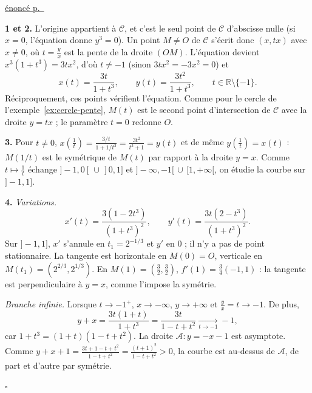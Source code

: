 \documentclass[a4paper,11pt]{article}
\numberwithin{equation}{section}
\numberwithin{figure}{section}
\numberwithin{table}{section}
\theoremstyle{enonce}
\theoremstyle{exemple}
\theoremstyle{remarque}
\newenvironment{corrige}[1]{%
  \par\needspace{6\baselineskip}\vspace{1em}\phantomsection\label{c:#1}%
  \noindent{\sffamily\bfseries\color{Bleu}Exercice~\ref{e:#1}}\quad
  {\scriptsize\sffamily\hyperref[e:#1]{\color{Gris}énoncé p.~\pageref{e:#1}}}\par\nobreak\vspace{0.2em}}%
  {\hfill\textcolor{BleuClair}{$\square$}\par}
\newcommand{\R}{\mathbb{R}}
\begin{document}
\begin{corrige}{b-folium}
\textbf{1 et 2.} L'origine appartient à $\mathcal C$, et c'est le seul point de $\mathcal C$ d'abscisse nulle (si $x=0$,
l'équation donne $y^3=0$). Un point $M\neq O$ de $\mathcal C$ s'écrit donc $(x,tx)$ avec $x\neq0$, où $t=\frac yx$ est la
pente de la droite $(OM)$. L'équation devient $x^3(1+t^3)=3tx^2$, d'où $t\neq-1$ (sinon $3tx^2=-3x^2=0$) et
\[x(t)=\frac{3t}{1+t^3},\qquad y(t)=\frac{3t^2}{1+t^3},\qquad t\in\R\setminus\{-1\}.\]
Réciproquement, ces points vérifient l'équation. Comme pour le cercle de l'exemple~\ref{ex:cercle-pente}, $M(t)$ est le
second point d'intersection de $\mathcal C$ avec la droite $y=tx$ ; le paramètre $t=0$ redonne $O$.

\textbf{3.} Pour $t\neq0$, $x\left(\frac1t\right)=\frac{3/t}{1+1/t^3}=\frac{3t^2}{t^3+1}=y(t)$ et de même
$y\left(\frac1t\right)=x(t)$ : $M(1/t)$ est le symétrique de $M(t)$ par rapport à la droite $y=x$. Comme $t\mapsto\frac1t$
échange $]-1,0[\,\cup\,]0,1]$ et $]-\infty,-1[\,\cup\,[1,+\infty[$, on étudie la courbe sur $]-1,1]$.

\textbf{4.} \emph{Variations.}
\[x'(t)=\frac{3(1-2t^3)}{(1+t^3)^2},\qquad y'(t)=\frac{3t(2-t^3)}{(1+t^3)^2}.\]
Sur $]-1,1]$, $x'$ s'annule en $t_1=2^{-1/3}$ et $y'$ en $0$ ; il n'y a pas de point stationnaire. La tangente est
horizontale en $M(0)=O$, verticale en $M(t_1)=\left(2^{2/3},2^{1/3}\right)$. En $M(1)=\left(\frac32,\frac32\right)$,
$f'(1)=\frac34(-1,1)$ : la tangente est perpendiculaire à $y=x$, comme l'impose la symétrie.
\begin{center}
\end{center}

\emph{Branche infinie.} Lorsque $t\to-1^+$, $x\to-\infty$, $y\to+\infty$ et $\frac yx=t\to-1$. De plus,
\[y+x=\frac{3t(1+t)}{1+t^3}=\frac{3t}{1-t+t^2}\xrightarrow[t\to-1]{}-1,\]
car $1+t^3=(1+t)(1-t+t^2)$. La droite $\mathcal A:y=-x-1$ est asymptote. Comme
$y+x+1=\frac{3t+1-t+t^2}{1-t+t^2}=\frac{(t+1)^2}{1-t+t^2}>0$, la courbe est au-dessus de $\mathcal A$, de part et d'autre
par symétrie.


\end{corrige}
\end{document}

